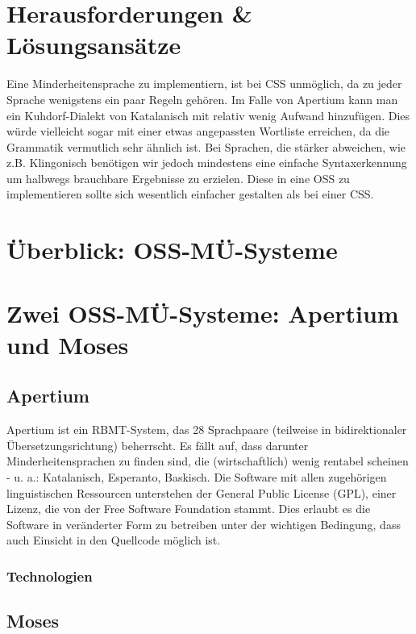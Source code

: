\documentclass[11pt,twoside]{mparticle}
\begin{document}
\section{Herausforderungen \& Lösungsansätze}
\label{herausforderungen}
Eine Minderheitensprache zu implementiern, ist bei CSS unmöglich, da
zu jeder Sprache wenigstens ein paar Regeln gehören. Im Falle von
Apertium kann man ein Kuhdorf-Dialekt von Katalanisch mit relativ
wenig Aufwand hinzufügen. Dies würde vielleicht sogar mit einer etwas
angepassten Wortliste erreichen, da die Grammatik vermutlich sehr
ähnlich ist. Bei Sprachen, die stärker abweichen, wie z.B. Klingonisch
benötigen wir jedoch mindestens eine einfache Syntaxerkennung um
halbwegs brauchbare Ergebnisse zu erzielen. Diese in eine OSS zu
implementieren sollte sich wesentlich einfacher gestalten als bei
einer CSS.

\section{Überblick: OSS-MÜ-Systeme}
\label{ueberblick}

\section{Zwei OSS-MÜ-Systeme: Apertium und Moses}
\label{apertiumMoses}


\subsection{Apertium}
\label{apertium}
Apertium ist ein RBMT-System, das 28 Sprachpaare 
(teilweise in bidirektionaler Übersetzungsrichtung) beherrscht. Es fällt auf, dass darunter
Minderheitensprachen zu finden sind, die (wirtschaftlich) wenig rentabel scheinen -
u. a.: Katalanisch, Esperanto, Baskisch. Die Software mit allen zugehörigen
linguistischen Ressourcen unterstehen der General Public License (GPL), einer Lizenz, die von der Free Software
Foundation stammt. Dies erlaubt es die Software in veränderter Form zu betreiben unter
der wichtigen Bedingung, dass auch Einsicht in den Quellcode möglich ist.

\subsubsection{Technologien}

\subsection{Moses}
\label{moses}
\end{document}
